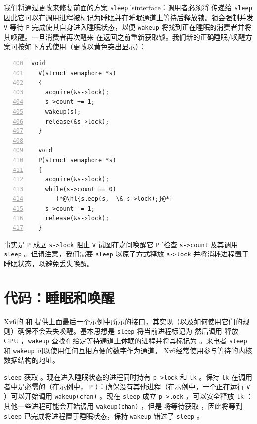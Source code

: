 \documentclass[UTF8]{article}
\begin{document}
我们将通过更改来修复前面的方案
    \lstinline{sleep}    'sinterface：调用者必须将        传递给
    \lstinline{sleep}    因此它可以在调用进程被标记为睡眠并在睡眠通道上等待后释放锁。锁会强制并发
    \lstinline{V}    等待    \lstinline{P}    完成使其自身进入睡眠状态，以便
    \lstinline{wakeup}   将找到正在睡眠的消费者并将其唤醒。一旦消费者再次醒来
        在返回之前重新获取锁。我们新的正确睡眠/唤醒方案可按如下方式使用（更改以黄色突出显示）：
    \begin{lstlisting}[numbers=left,firstnumber=400]
  void
  V(struct semaphore *s)
  {
    acquire(&s->lock);
    s->count += 1;
    wakeup(s);
    release(&s->lock);
  }

  void
  P(struct semaphore *s)
  {
    acquire(&s->lock);
    while(s->count == 0)
       (*@\hl{sleep(s,  \& s->lock);}@*)
    s->count -= 1;
    release(&s->lock);
  }
\end{lstlisting}     

事实是
    \lstinline{P}    成立
    \lstinline{s->lock}    阻止
    \lstinline{V}    试图在之间唤醒它
    \lstinline{P}   '检查
    \lstinline{s->count}    及其调用
    \lstinline{sleep}    。但请注意，我们需要
    \lstinline{sleep}    以原子方式释放
    \lstinline{s->lock}    并将消耗进程置于睡眠状态，以避免丢失唤醒。
    \section{代码：睡眠和唤醒  }     

Xv6的
        和
        提供上面最后一个示例中所示的接口，其实现（以及如何使用它们的规则）确保不会丢失唤醒。基本思想是
    \lstinline{sleep}    将当前进程标记为
        然后调用
        释放CPU；
    \lstinline{wakeup}    查找在给定等待通道上休眠的进程并将其标记为
        。来电者
    \lstinline{sleep}    和
    \lstinline{wakeup}    可以使用任何互相方便的数字作为通道。 Xv6经常使用参与等待的内核数据结构的地址。  

   \lstinline{sleep}    获取
        。现在进入睡眠状态的进程同时持有
    \lstinline{p->lock}    和
    \lstinline{lk}    。保持
    \lstinline{lk}    在调用者中是必需的（在示例中，
    \lstinline{P}    ）：确保没有其他进程（在示例中，一个正在运行
    \lstinline{V}    ）可以开始调用
    \lstinline{wakeup(chan)}    。现在
    \lstinline{sleep}    成立
    \lstinline{p->lock}    ，可以安全释放
    \lstinline{lk}    ：其他一些进程可能会开始调用
    \lstinline{wakeup(chan)}    ，但是
        将等待获取
        ，因此将等到
    \lstinline{sleep}    已完成将进程置于睡眠状态，保持
    \lstinline{wakeup}    错过了
    \lstinline{sleep}    。  
\end{document}
